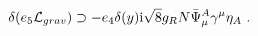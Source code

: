 \begin{equation}  \label{initvarbrane}
\delta  (e_5{\cal L}_{grav}) \supset -e_4\delta(y){\rm i}\sqrt{8}g_R N\bar{\Psi}_\mu^A\gamma^\mu \eta_A\ . 
   \end{equation} 

